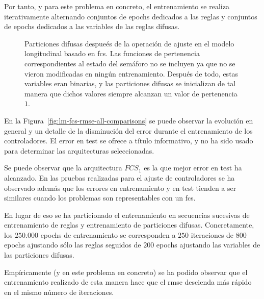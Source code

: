 Por tanto, y para este problema en concreto, el entrenamiento se realiza iterativamente alternando conjuntos de epochs dedicados a las reglas y conjuntos de epochs dedicados a las variables de las reglas difusas.

\begin{figure}[!b]
	\centering
	\qquad
	\qquad
	\qquad
	\caption[Particiones difusas después de la operación de ajuste en el modelo longitudinal basado en \ac{fcs}]{Particiones difusas despueés de la operación de ajuste en el modelo longitudinal basado en \ac{fcs}. Las funciones de pertenencia correspondientes al estado del semáforo no se incluyen ya que no se vieron modificadas en ningún entrenamiento. Después de todo, estas variables eran binarias, y las particiones difusas se inicializan de tal manera que dichos valores siempre alcanzan un valor de pertenencia $1$.}
	\label{fig:adjusted-fuzzy-partitions}
\end{figure}

En la Figura~\ref{fig:lm-fcs-rmse-all-comparisons} se puede observar la evolución en general y un detalle de la disminución del error durante el entrenamiento de los controladores. El error en test se ofrece a título informativo, y no ha sido usado para determinar las arquitecturas seleccionadas.

Se puede observar que la arquitectura $FCS_1$ es la que mejor error en test ha alcanzado. En las pruebas realizadas para el ajuste de controladores se ha observado además que los errores en entrenamiento y en test tienden a ser similares cuando los problemas son representables con un \ac{fcs}.

En lugar de eso se ha particionado el entrenamiento en secuencias sucesivas de entrenamiento de reglas y entrenamiento de particiones difusas. Concretamente, los $250.000$ epochs de entrenamiento se corresponden a $250$ iteraciones de $800$ epochs ajustando sólo las reglas seguidos de $200$ epochs ajustando las variables de las particiones difusas.

Empíricamente (y en este problema en concreto) se ha podido observar que el entrenamiento realizado de esta manera hace que el \ac{rmse} descienda más rápido en el mismo número de iteraciones.


